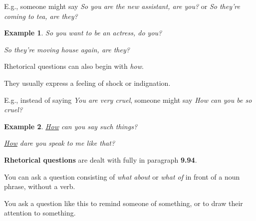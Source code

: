 \documentclass[oneside]{book}
\numberwithin{equation}{section}
\newtheorem{example}{Example}[section]
\begin{document}
E.g., someone might say \textit{So you are the new assistant, are you?} or \textit{So they're coming to tea, are they?}
\begin{example}
    So you want to be an actress, do you?
    
    So they're moving house again, are they?
\end{example}
Rhetorical questions can also begin with \textit{how}.

They usually express a feeling of shock or indignation.

E.g., instead of saying \textit{You are very cruel}, someone might say \textit{How can you be so cruel?}
\begin{example}
    \underline{How} can you say such things?
    
    \underline{How} dare you speak to me like that?
\end{example}
\textbf{Rhetorical questions} are dealt with fully in paragraph \textbf{9.94}.

%
\noindent{} You can ask a question consisting of \textit{what about} or \textit{what of} in front of a noun phrase, without a verb.

You ask a question like this to remind someone of something, or to draw their attention to something.
\end{document}
